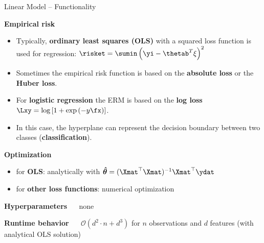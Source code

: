 \documentclass[11pt,compress,t,notes=noshow, xcolor=table]{beamer}
\newcommand{\highlight}[1]{\textcolor{highlightcol}{\textbf{#1}}}
\begin{document}
\begin{frame}{Linear Model -- Functionality}

\footnotesize

\highlight{Empirical risk}
\begin{itemize}\footnotesize
  \item Typically, \textbf{ordinary least squares (OLS)} with a squared loss function is used for regression: $\risket  = \sumin \left(\yi - \thetab^T \xi\right)^2$
    
   \item Sometimes the empirical risk function is based on the \textbf{absolute loss} or the \textbf{Huber loss}. %
  
  \item For \textbf{logistic regression} the ERM is based on the \textbf{log loss} $\Lxy = \log \left[1 + \exp \left(-y\fx\right)\right]$.
  
  \item In this case, the hyperplane can represent the decision boundary between two classes (\textbf{classification}). 


\end{itemize}

\footnotesize

\medskip

\highlight{Optimization} ~~ 
\begin{itemize}\footnotesize
  \item for \textbf{OLS}: analytically with $\bm{\hat \theta} = (\Xmat^\top \Xmat)^{-1} \Xmat^\top\ydat$
  \item for \textbf{other loss functions}: numerical optimization 
\end{itemize}

\medskip

\highlight{Hyperparameters} ~~ none \\

\medskip

\highlight{Runtime behavior} ~~ $\mathcal{O}(d^2 \cdot n + d^3)$ for $n$ 
observations and $d$ features (with analytical OLS solution)

\end{frame}

\end{document}
